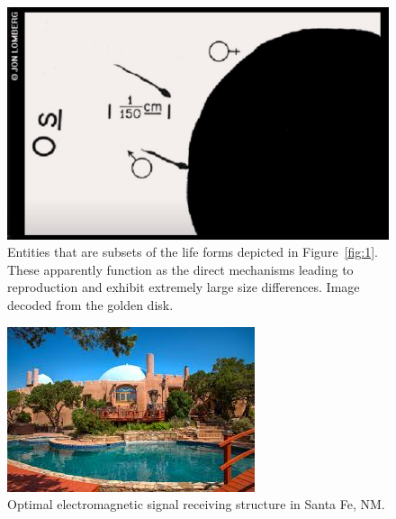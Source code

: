 \begin{figure}
\includegraphics[width=1\columnwidth]{spermandegg_voyager.jpg}
\caption{Entities that are subsets of the life forms depicted in Figure~\ref{fig:1}. These apparently function as the direct mechanisms leading to reproduction and exhibit extremely large size differences. Image decoded from the golden disk.
\label{fig:2}}
\end{figure}

\begin{figure}
\includegraphics[width=1\columnwidth]{rassMandal.jpg}
\caption{Optimal electromagnetic signal receiving structure in Santa Fe, NM.
\label{fig:3}}
\end{figure}



